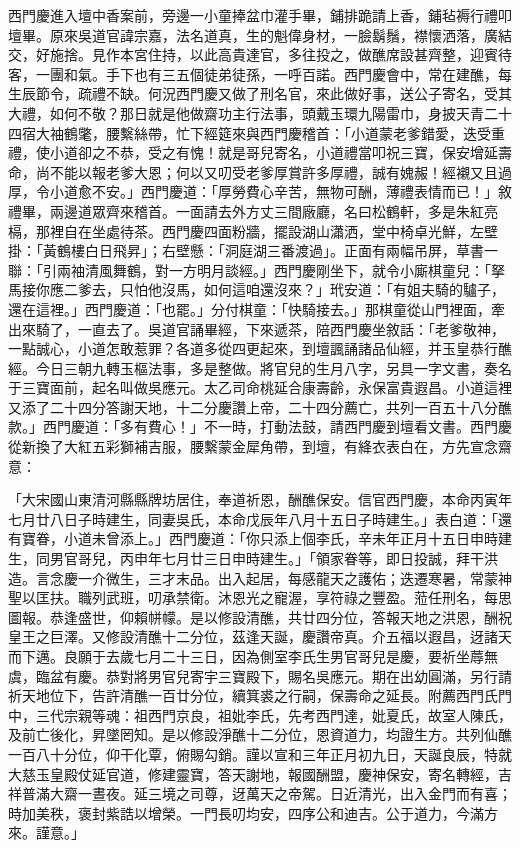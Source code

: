 \begin{showcontents}{}
西門慶進入壇中香案前，旁邊一小童捧盆巾灌手畢，鋪排跪請上香，鋪毡褥行禮叩壇畢。原來吳道官諱宗嘉，法名道真，生的魁偉身材，一臉鬍鬚，襟懷洒落，廣結交，好施捨。見作本宮住持，以此高貴達官，多往投之，做醮席設甚齊整，迎賓待客，一團和氣。手下也有三五個徒弟徒孫，一呼百諾。西門慶會中，常在建醮，每生辰節令，疏禮不缺。何況西門慶又做了刑名官，來此做好事，送公子寄名，受其大禮，如何不敬？那日就是他做齋功主行法事，頭戴玉環九陽雷巾，身披天青二十四宿大袖鶴氅，腰繫絲帶，忙下經筵來與西門慶稽首：「小道蒙老爹錯愛，迭受重禮，使小道卻之不恭，受之有愧！就是哥兒寄名，小道禮當叩祝三寶，保安增延壽命，尚不能以報老爹大恩；何以又叨受老爹厚賞許多厚禮，誠有媿赧！經襯又且過厚，令小道愈不安。」西門慶道：「厚勞費心辛苦，無物可酬，薄禮表情而已！」敘禮畢，兩邊道眾齊來稽首。一面請去外方丈三間廠廳，名曰松鶴軒，多是朱紅亮槅，那裡自在坐處待茶。西門慶四面粉牆，擺設湖山瀟洒，堂中椅卓光鮮，左壁掛：「黃鶴樓白日飛昇」；右壁懸：「洞庭湖三番渡過」。正面有兩幅吊屏，草書一聯：「引兩袖清風舞鶴，對一方明月談經。」西門慶剛坐下，就令小廝棋童兒：「拏馬接你應二爹去，只怕他沒馬，如何這咱還沒來？」玳安道：「有姐夫騎的驢子，還在這裡。」西門慶道：「也罷。」分付棋童：「快騎接去。」那棋童從山門裡面，牽出來騎了，一直去了。吳道官誦畢經，下來遞茶，陪西門慶坐敘話：「老爹敬神，一點誠心，小道怎敢惹罪？各道多從四更起來，到壇諷誦諸品仙經，并玉皇恭行醮經。今日三朝九轉玉樞法事，多是整做。將官兒的生月八字，另具一字文書，奏名于三寶面前，起名叫做吳應元。太乙司命桃延合康壽齡，永保富貴遐昌。小道這裡又添了二十四分答謝天地，十二分慶讚上帝，二十四分薦亡，共列一百五十八分醮款。」西門慶道：「多有費心！」不一時，打動法鼓，請西門慶到壇看文書。西門慶從新換了大紅五彩獅補吉服，腰繫蒙金犀角帶，到壇，有絳衣表白在，方先宣念齋意：

「大宋國山東清河縣縣牌坊居住，奉道祈恩，酬醮保安。信官西門慶，本命丙寅年七月廿八日子時建生，同妻吳氏，本命戊辰年八月十五日子時建生。」表白道：「還有寶眷，小道未曾添上。」西門慶道：「你只添上個李氏，辛未年正月十五日申時建生，同男官哥兒，丙申年七月廿三日申時建生。」「領家眷等，即日投誠，拜干洪造。言念慶一介微生，三才末品。出入起居，每感龍天之護佑；迭遷寒暑，常蒙神聖以匡扶。職列武班，叨承禁衛。沐恩光之寵渥，享符祿之豐盈。蒞任刑名，每思圖報。恭逢盛世，仰賴帡幪。是以修設清醮，共廿四分位，答報天地之洪恩，酬祝皇王之巨澤。又修設清醮十二分位，茲逢天誕，慶讚帝真。介五福以遐昌，迓諸天而下邁。良願于去歲七月二十三日，因為側室李氏生男官哥兒是慶，要祈坐蓐無虞，臨盆有慶。恭對將男官兒寄宇三寶殿下，賜名吳應元。期在出幼圓滿，另行請祈天地位下，告許清醮一百廿分位，續箕裘之行嗣，保壽命之延長。附薦西門氏門中，三代宗親等魂：祖西門京良，祖妣李氏，先考西門達，妣夏氏，故室人陳氏，及前亡後化，昇墜罔知。是以修設淨醮十二分位，恩資道力，均證生方。共列仙醮一百八十分位，仰干化覃，俯賜勾銷。謹以宣和三年正月初九日，天誕良辰，特就大慈玉皇殿仗延官道，修建靈寶，答天謝地，報國酬盟，慶神保安，寄名轉經，吉祥普滿大齋一晝夜。延三境之司尊，迓萬天之帝駕。日近清光，出入金門而有喜；時加美秩，褒封紫誥以增榮。一門長叨均安，四序公和迪吉。公于道力，今滿方來。謹意。」


\end{showcontents}
